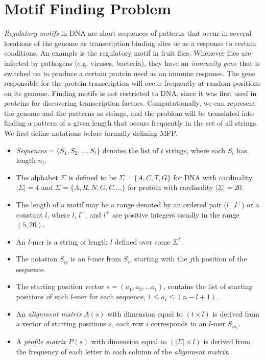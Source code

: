 \documentclass{llncs}
\begin{document}
\section{Motif Finding Problem}\label{motifFindingProblem}
\noindent  \textit{Regulatory motifs} in DNA are short sequences of patterns that occur in several locations of the genome as transcription binding sites or as a response to certain conditions. An example is the regulatory motif  in  fruit flies. Whenever flies are infected by pathogens (e.g. viruses, bacteria), they have an \textit{immunity gene} that is switched on to produce a certain protein used as an immune response. The gene responsible for the protein transcription will occur frequently at random positions on its genome. Finding motifs is not restricted to DNA, since it was first used in proteins for discovering transcription factors. Computationally, we can represent the genome and the patterns as strings, and the problem will be translated into finding a pattern of a given length that occurs frequently in the set of all strings. We first define notations before formally defining MFP.

\begin{itemize}

\item \textit{Sequences}$= \{S_1, S_2, ..., S_t\}$ denotes the list of $t$ strings, where each $S_i$ has length $n_i$. 

\item The alphabet $\Sigma$ is defined to be $\Sigma=\{A, C, T, G\}$ for DNA with cardinality $|\Sigma|=4$ and $\Sigma= \{A, R, N, G, C....\}$ for protein with cardinality $|\Sigma|=20$. 

\item The length of  a motif may be a range denoted by an ordered pair ($l^-$,$l^+$) or a constant $l$, where $l$, $l^{-}$, and $l^{+}$ are positive integers usually in the range $(5,20)$.

\item An $l$-mer is a string of length $l$ defined over some $\Sigma^{*}$. 

\item The notation $S_{ij}$ is an $l$-mer from $S_i$, starting with the $j$th position of the sequence.

\item The starting position vector $s=(a_1,a_2, ... a_t)$, contains the list of starting positions of each $l$-mer for each sequence, $1 \leq a_i \leq (n- l + 1)$.

\item An \textit{alignment matrix} $A(s)$ with dimension equal to $(t \times l)$ is derived from a vector of starting positions $s$, each row $i$ corresponds to an $l$-mer $S_{ia_i}$.

\item A \textit{profile matrix} $P(s)$ with dimension equal to $(|\Sigma| \times l)$ is derived from the frequency of each letter in each column of the \textit{alignment matrix}.
\end{itemize}
\end{document}
